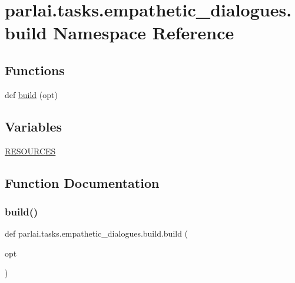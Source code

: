 \hypertarget{namespaceparlai_1_1tasks_1_1empathetic__dialogues_1_1build}{}\section{parlai.\+tasks.\+empathetic\+\_\+dialogues.\+build Namespace Reference}
\label{namespaceparlai_1_1tasks_1_1empathetic__dialogues_1_1build}
\subsection*{Functions}
\begin{DoxyCompactItemize}
\item 
def \hyperlink{namespaceparlai_1_1tasks_1_1empathetic__dialogues_1_1build_a01521757f3dbc3edcfe2f9ca39027688}{build} (opt)
\end{DoxyCompactItemize}
\subsection*{Variables}
\begin{DoxyCompactItemize}
\item 
\hyperlink{namespaceparlai_1_1tasks_1_1empathetic__dialogues_1_1build_a29aee0609ee33d7b70477abd2862688d}{R\+E\+S\+O\+U\+R\+C\+ES}
\end{DoxyCompactItemize}


\subsection{Function Documentation}
\mbox{\label{namespaceparlai_1_1tasks_1_1empathetic__dialogues_1_1build_a01521757f3dbc3edcfe2f9ca39027688}} 
\subsubsection{\texorpdfstring{build()}{build()}}
{\footnotesize\ttfamily def parlai.\+tasks.\+empathetic\+\_\+dialogues.\+build.\+build (\begin{DoxyParamCaption}\item[{}]{opt }\end{DoxyParamCaption})}



